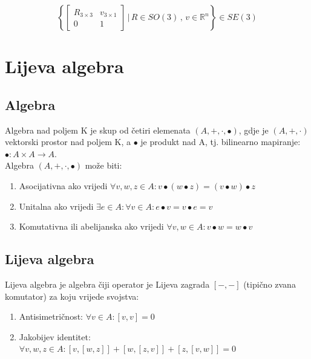 \documentclass[times, utf8, diplomski]{fer}
\begin{document}
	\begin{equation}
		\left \{
		\begin{bmatrix}
		R_{3 \times 3} & v_{3 \times 1} \\
		0 & 1
		\end{bmatrix}
		\, \Biggr\rvert \, R \in SO(3) \, , \, v \in \mathbb{R}^n
		\right \} \in SE(3)
	\end{equation}	

\section{Lijeva algebra}

	\subsection{Algebra} Algebra nad poljem K je skup od četiri elemenata $(A, +, \cdot, \bullet)$, gdje je $(A, +, \cdot)$ vektorski prostor nad poljem K, a $\bullet$ je produkt nad A, tj. bilinearno mapiranje: $\bullet : A \times A \rightarrow A$. \\
	Algebra $(A, +, \cdot, \bullet)$ može biti:
	\begin{enumerate}
		\item Asocijativna ako vrijedi $\forall v, w, z \in A : v \bullet (w \bullet z) = (v \bullet w) \bullet z$
		
		\item Unitalna ako vrijedi $\exists e \in A : \forall v \in A : e \bullet v = v \bullet e = v$
		
		\item Komutativna ili abelijanska ako vrijedi $\forall v, w \in A : v \bullet w = w \bullet v$
	\end{enumerate}
	
	\subsection{Lijeva algebra} Lijeva algebra je algebra čiji operator je Lijeva zagrada $[-,-]$ (tipično zvana komutator) za koju vrijede svojstva: 
	
	\begin{enumerate}
		
		\item Antisimetričnost: $\forall v \in A: [v, v] = 0$
		
		\item Jakobijev identitet: $\forall v, w, z \in A : [v,[w, z]] + [w,[z,v]] + [z,[v,w]] = 0$
		
	\end{enumerate} 
	
\end{document}
